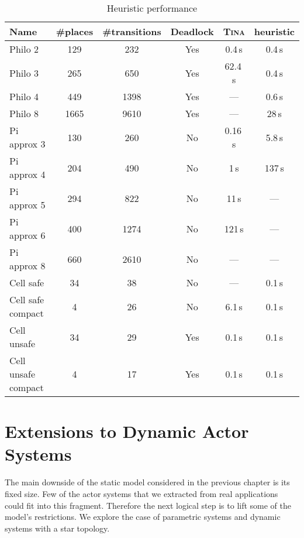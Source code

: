 \documentclass[a4paper]{report}
\numberwithin{algorithm}{chapter}
\begin{document}
\begin{table}
\caption{Heuristic performance}
\label{tblComp}
\begin{tabular}{l|cc|c|c|c}
Name & \#places & \#transitions & Deadlock & \textsc{Tina}\cite{DBLP:conf/qest/BerthomieuV06} & heuristic \\
\hline
\hline
Philo 2             & 129     & 232          & Yes      & 0.4\,s   & 0.4\,s \\
Philo 3             & 265     & 650          & Yes      & 62.4\,s  & 0.4\,s \\
Philo 4             & 449     & 1398         & Yes      & ---      & 0.6\,s \\
Philo 8             & 1665    & 9610         & Yes      & ---      & 28\,s \\
\hline
Pi approx 3         & 130     & 260          & No       & 0.16\,s  & 5.8\,s \\
Pi approx 4         & 204     & 490          & No       & 1\,s     & 137\,s \\
Pi approx 5         & 294     & 822          & No       & 11\,s    & --- \\
Pi approx 6         & 400     & 1274         & No       & 121\,s   & --- \\
Pi approx 8         & 660     & 2610         & No       & ---      & --- \\
\hline
Cell safe           & 34      & 38           & No       & ---      & 0.1\,s \\
Cell safe compact   & 4       & 26           & No       & 6.1\,s   & 0.1\,s \\
Cell unsafe         & 34      & 29           & Yes      & 0.1\,s   & 0.1\,s \\
Cell unsafe compact & 4       & 17           & Yes      & 0.1\,s   & 0.1\,s    
\end{tabular}

\end{table}


\chapter{Extensions to Dynamic Actor Systems}
\label{chapDynamic} 
The main downside of the static model considered in the previous chapter is its fixed size.
Few of the actor systems that we extracted from real applications could fit into this fragment.
Therefore the next logical step is to lift some of the model's restrictions.
We explore the case of parametric systems and dynamic systems with a star topology.
\end{document}
